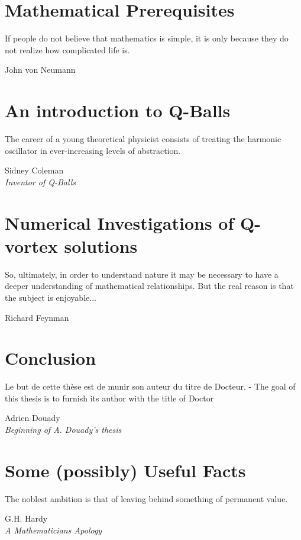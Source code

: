 \documentclass[12pt]{report}
\theoremstyle{definition}
\begin{document}
\chapter{Mathematical Prerequisites}\label{chap:prereqs}
\epigraph{If people do not believe that mathematics is simple, it is only because they do not realize how complicated life is.}{John von Neumann}


\chapter{An introduction to Q-Balls}\label{chap:qballs}
\epigraph{The career of a young theoretical physicist consists of treating the harmonic oscillator in ever-increasing levels of abstraction.}{Sidney Coleman\\\textit{Inventor of Q-Balls}}


\chapter{Numerical Investigations of Q-vortex solutions}\label{chap:numerics}
\epigraph{So, ultimately, in order to understand nature it may be necessary to have a deeper understanding of mathematical relationships. But the real reason is that the subject is enjoyable...}{Richard Feynman}


\chapter{Conclusion}\label{chap:conclusion}
\epigraph{Le but de cette thèse est de munir son auteur du titre de Docteur. - The goal of this thesis is to furnish its author with the title of Doctor}{Adrien Douady\\\textit{Beginning of A. Douady's thesis}}


\appendix
\chapter{Some (possibly) Useful Facts}\label{chap:appendix}
\epigraph{The noblest ambition is that of leaving behind something of permanent value.}{G.H. Hardy\\\textit{A Mathematicians Apology}}




\end{document}
